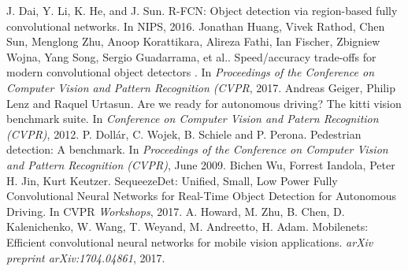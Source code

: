\documentclass[conference]{IEEEtran}
\begin{document}
\begin{thebibliography}{00}
 J. Dai, Y. Li, K. He, and J. Sun. R-FCN: Object detection via
region-based fully convolutional networks. In NIPS, 2016.
 Jonathan Huang, Vivek Rathod, Chen Sun, Menglong Zhu, Anoop Korattikara, Alireza Fathi, Ian Fischer, Zbigniew Wojna, Yang Song, Sergio Guadarrama, et al.. Speed/accuracy trade-offs for modern convolutional object detectors . In \textit{Proceedings of the Conference on Computer Vision and Pattern Recognition (CVPR}, 2017.
 Andreas Geiger, Philip Lenz and Raquel Urtasun. Are we ready for autonomous driving? The kitti vision benchmark suite. In \textit{Conference on Computer Vision and Patern Recognition (CVPR)}, 2012.
 P. Dollár, C. Wojek, B. Schiele and P. Perona. Pedestrian detection: A benchmark. In \textit{Proceedings of the Conference on Computer Vision and Pattern Recognition (CVPR)}, June 2009.
 Bichen Wu, Forrest Iandola, Peter H. Jin, Kurt Keutzer. SequeezeDet: Unified, Small, Low Power Fully Convolutional Neural Networks for Real-Time Object Detection for Autonomous Driving. In CVPR \textit{Workshops}, 2017.
 A. Howard, M. Zhu, B. Chen, D. Kalenichenko, W. Wang, T. Weyand, M. Andreetto, H. Adam. Mobilenets: Efficient convolutional neural networks for mobile vision applications. \textit{arXiv preprint arXiv:1704.04861}, 2017.
\end{thebibliography}
\vspace{12pt}
\end{document}
